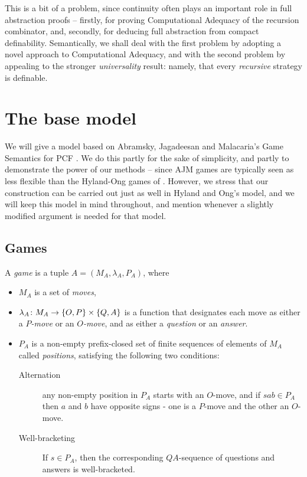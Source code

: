\documentclass[sigplan,10pt,review]{acmart}\settopmatter{printfolios=true,printccs=false,printacmref=false}
\begin{document}
This is a bit of a problem, since continuity often plays an important role in full abstraction proofs -- firstly, for proving Computational Adequacy of the recursion combinator, and, secondly, for deducing full abstraction from compact definability.  
Semantically, we shall deal with the first problem by adopting a novel approach to Computational Adequacy, and with the second problem by appealing to the stronger \emph{universality} result: namely, that every \emph{recursive} strategy is definable.

\section{The base model}

We will give a model based on Abramsky, Jagadeesan and Malacaria's Game Semantics for PCF \cite{ajmPcf}.  
We do this partly for the sake of simplicity, and partly to demonstrate the power of our methods -- since AJM games are typically seen as less flexible than the Hyland-Ong games of \cite{hoPcf}.  
However, we stress that our construction can be carried out just as well in Hyland and Ong's model, and we will keep this model in mind throughout, and mention whenever a slightly modified argument is needed for that model.  

\subsection{Games}

A \emph{game} is a tuple $A=(M_A,\lambda_A,P_A)$, where
\begin{itemize}
  \item $M_A$ is a set of \emph{moves},
  \item $\lambda_A\colon M_A \to \{O,P\}\times\{Q,A\}$ is a function that designates each move as either a \emph{$P$-move} or an \emph{$O$-move}, and as either a \emph{question} or an \emph{answer}.
  \item $P_A$ is a non-empty prefix-closed set of finite sequences of elements of $M_A$ called \emph{positions}, satisfying the following two conditions:
    \begin{description}
      \item[Alternation] any non-empty position in $P_A$ starts with an $O$-move, and if $sab\in P_A$ then $a$ and $b$ have opposite signs - one is a $P$-move and the other an $O$-move.  
      \item[Well-bracketing] If $s\in P_A$, then the corresponding $QA$-sequence of questions and answers is well-bracketed.
    \end{description}
\end{itemize}
\end{document}
